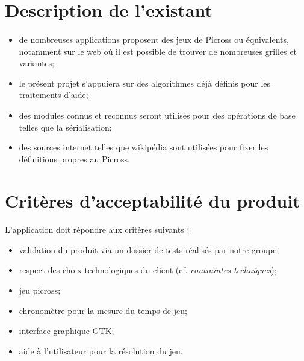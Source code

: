 \section{Description de l'existant}
        \paragraph*{}
        \begin{itemize}
                \item de nombreuses applications proposent des jeux de Picross ou équivalents, notamment sur le web où il est possible de trouver de nombreuses grilles et variantes;
                \item le présent projet s'appuiera sur des algorithmes déjà définis pour les traitements d'aide;
                \item des modules connus et reconnus seront utilisés pour des opérations de base telles que la sérialisation;
                \item des sources internet telles que wikipédia sont utilisées pour fixer les définitions propres au Picross.
        \end{itemize}


\section{Critères d'acceptabilité du produit}
        \paragraph*{}
        L'application doit répondre aux critères suivants :
        \begin{itemize}
                \item validation du produit via un dossier de tests réalisés par notre groupe;
                \item respect des choix technologiques du client (cf. \textit{contraintes techniques});
                \item jeu picross;
                \item chronomètre pour la mesure du temps de jeu;
                \item interface graphique GTK;
                \item aide à l'utilisateur pour la résolution du jeu.
        \end{itemize}




